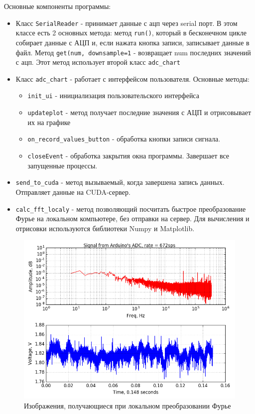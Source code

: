 \documentclass[../paper.tex]{subfiles}
\begin{document}
Основные компоненты программы:
\begin{itemize}
  \item Класс \lstinline|SerialReader| - принимает данные с ацп через serial порт. В этом классе есть 2 основных метода: метод \lstinline|run()|, который в бесконечном цикле собирает данные с АЦП и, если нажата кнопка записи, записывает данные в файл. Метод \lstinline|get(num, downsample=1| - возвращает num последних значений с ацп. Этот метод использует второй класс \lstinline|adc_chart|
  \item Класс \lstinline|adc_chart| - работает с интерфейсом пользователя. Основные методы: 
    \begin{itemize}
      \item \lstinline|init_ui| - инициализация пользовательского интерфейса
      \item \lstinline|updateplot| - метод получает последние значения с АЦП и отрисовывает их на графике
      \item \lstinline|on_record_values_button| - обработка кнопки записи сигнала.
      \item \lstinline|closeEvent| - обработка закрытия окна программы. Завершает все запущенные процессы.
    \end{itemize}
  \item \lstinline|send_to_cuda| - метод вызываемый, когда завершена запись данных. Отправляет данные на CUDA-сервер.
  \item \lstinline|calc_fft_localy| - метод позволяющий посчитать быстрое преобразование Фурье на локальном компьютере, без отправки на сервер. Для вычисления и отрисовки используются библиотеки Numpy и Matplotlib.
\end{itemize}

\begin{figure}[H]
\centering
\includegraphics[width=\textwidth]{images/fft-local}
\caption{Изображения, получающиеся при локальном преобразовании Фурье}
\end{figure}
\end{document}
